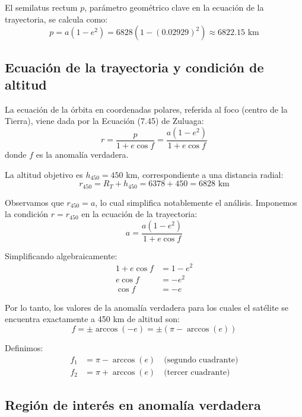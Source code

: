 \documentclass[12pt, a4paper]{article}
\begin{document}
El semilatus rectum $p$, parámetro geométrico clave en la ecuación de la trayectoria, se calcula como:
\begin{equation}
    p = a(1 - e^2) = 6828\left(1 - (0.02929)^2\right) \approx 6822.15 \text{ km}
\end{equation}

\subsection*{Ecuación de la trayectoria y condición de altitud}

La ecuación de la órbita en coordenadas polares, referida al foco (centro de la Tierra), viene dada por la Ecuación (7.45) de Zuluaga:
\begin{equation}
    r = \frac{p}{1 + e\cos f} = \frac{a(1-e^2)}{1 + e\cos f}
\end{equation}
donde $f$ es la anomalía verdadera.

La altitud objetivo es $h_{450} = 450$ km, correspondiente a una distancia radial:
\begin{equation}
    r_{450} = R_T + h_{450} = 6378 + 450 = 6828 \text{ km}
\end{equation}

Observamos que $r_{450} = a$, lo cual simplifica notablemente el análisis. Imponemos la condición $r = r_{450}$ en la ecuación de la trayectoria:
\begin{equation}
    a = \frac{a(1-e^2)}{1 + e\cos f}
\end{equation}

Simplificando algebraicamente:
\begin{align}
    1 + e\cos f &= 1 - e^2 \\
    e\cos f &= -e^2 \\
    \cos f &= -e
\end{align}

Por lo tanto, los valores de la anomalía verdadera para los cuales el satélite se encuentra exactamente a 450 km de altitud son:
\begin{equation}
    f = \pm \arccos(-e) = \pm (\pi - \arccos(e))
\end{equation}

Definimos:
\begin{align}
    f_1 &= \pi - \arccos(e) \quad \text{(segundo cuadrante)} \\
    f_2 &= \pi + \arccos(e) \quad \text{(tercer cuadrante)}
\end{align}

\subsection*{Región de interés en anomalía verdadera}
\end{document}
